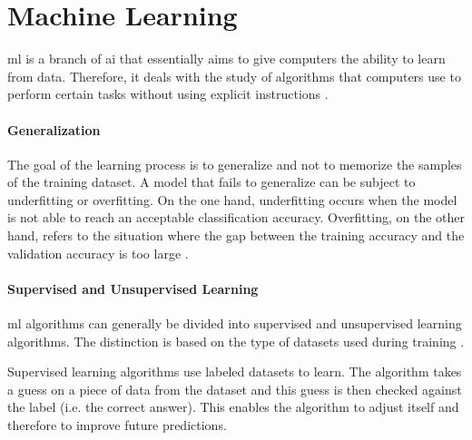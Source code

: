 \section{Machine Learning}
\label{sec:theoretical_background:ml}

\Acrlong{ml} is a branch of \acrlong{ai} that essentially aims to give computers the ability to learn from data.
Therefore, it deals with the study of algorithms that computers use to perform certain tasks without using explicit instructions \cite[p.~97]{deeplearningbook}.

\paragraph{Generalization}
The goal of the learning process is to generalize and not to memorize the samples of the training dataset.
A model that fails to generalize can be subject to underfitting or overfitting.
On the one hand, underfitting occurs when the model is not able to reach an acceptable classification accuracy.
Overfitting, on the other hand, refers to the situation where the gap between the training accuracy and the validation accuracy is too large \cite[p.~108--114]{deeplearningbook}.

\paragraph{Supervised and Unsupervised Learning}
\Acrlong{ml} algorithms can generally be divided into supervised and unsupervised learning algorithms.
The distinction is based on the type of datasets used during training \cite[p.~102--105]{deeplearningbook}.

Supervised learning algorithms use labeled datasets to learn.
The algorithm takes a guess on a piece of data from the dataset and this guess is then checked against the label (i.e. the correct answer).
This enables the algorithm to adjust itself and therefore to improve future predictions.

